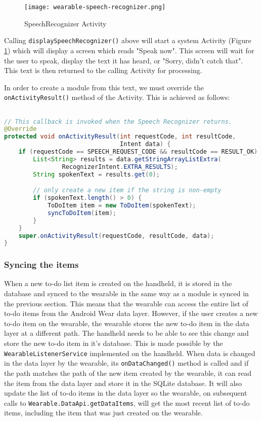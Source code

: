 \begin{figure}
    \centering
    \texttt{[image: wearable-speech-recognizer.png]}
    \caption{SpeechRecognizer Activity}
    \label{fig:speech_recognizer_activity}
\end{figure}

Calling \texttt{displaySpeechRecognizer()} above will start a system Activity
(Figure \ref{fig:speech_recognizer_activity})
which will display a screen which reads "Speak now". This screen will wait for
the user to speak, display the text it has heard, or "Sorry, didn't catch that".
This text is then returned to the calling Activity for processing.

In order to create a module from this text, we must override the
\texttt{onActivityResult()} method of the Activity. This is achieved as
follows:

\begin{lstlisting}[language=Java]

// This callback is invoked when the Speech Recognizer returns.
@Override
protected void onActivityResult(int requestCode, int resultCode,
                                Intent data) {
    if (requestCode == SPEECH_REQUEST_CODE && resultCode == RESULT_OK) {
        List<String> results = data.getStringArrayListExtra(
                RecognizerIntent.EXTRA_RESULTS);
        String spokenText = results.get(0);

        // only create a new item if the string is non-empty
        if (spokenText.length() > 0) {
            ToDoItem item = new ToDoItem(spokenText);
            syncToDoItem(item);
        }
    }
    super.onActivityResult(requestCode, resultCode, data);
}

\end{lstlisting}

\subsubsection{Syncing the items}

When a new to-do list item is created on the handheld, it is stored in the
database and synced to the wearable in the same way as a module is synced in
the previous section. This means that the wearable can access the entire list
of to-do items from the Android Wear data layer. However, if the user creates
a new to-do item on the wearable, the wearable stores the new to-do item in the
data layer at a different path. The handheld needs to be able to see this change
and store the new to-do item in it's database. This is made possible by the
\texttt{WearableListenerService} implemented on the handheld. When data is
changed in the data layer by the wearable, its \texttt{onDataChanged()} method
is called and if the path matches the path of the new item created by the
wearable, it can read the item from the data layer and store it in the SQLite
database. It will also update the list of to-do items in the data layer so the
wearable, on subsequent calls to \texttt{Wearable.DataApi.getDataItems}, will
get the most recent list of to-do items, including the item that was just
created on the wearable.

